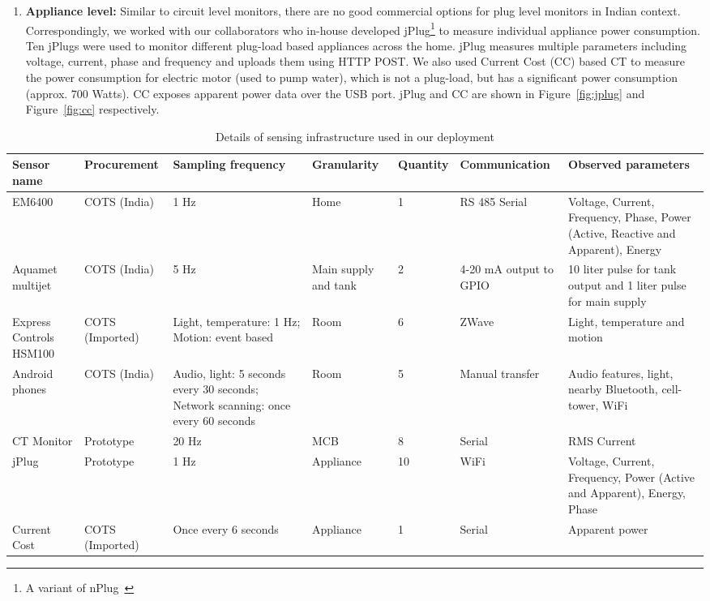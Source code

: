 \documentclass[10pt]{sensys-proc}
\newcommand{\figref}[1]{Figure~\ref{#1}}
\begin{document}
\begin{enumerate}[leftmargin=1em]
\vspace{-1.5mm} \item \textbf{Appliance level:} Similar to circuit level monitors, there are no good commercial options for plug level monitors in Indian context. Correspondingly, we worked with our collaborators who in-house developed jPlug\footnote{A variant of nPlug~\cite{nplug}} to measure individual appliance power consumption. Ten jPlugs were used to monitor different plug-load based appliances across the home. 
jPlug measures multiple parameters including voltage, current, phase and frequency and uploads them using HTTP POST. We also used Current Cost (CC) based CT to measure the power consumption for electric motor (used to pump water), which is not a plug-load, but has a significant power consumption (approx. 700 Watts). CC exposes apparent power data over the USB port.  jPlug and CC are shown in \figref{fig:jplug} and \figref{fig:cc} respectively.
\end{enumerate}
\begin{table}[t!]
\footnotesize
\centering
\vspace{-6mm}
\caption{Details of sensing infrastructure used in our deployment}
\vspace{-4mm}
\label{tab:sensing}
\tabcolsep=0.015cm
\begin{center}
\begin{tabular}{|p{1.7cm}|p{2.0cm}|p{3.3cm}|p{1.5cm}|p{1.5cm}|p{2.0cm}|p{5.2cm}|}
\hline
\textbf{Sensor name} & \textbf{Procurement} & \textbf{Sampling frequency} & \textbf{Granularity} & \textbf{Quantity} & \textbf{Communication} & \textbf{Observed parameters}\\
\hline

EM6400& COTS (India)&1 Hz&Home&1&RS 485 Serial&Voltage, Current, Frequency, Phase, Power (Active, Reactive and Apparent), Energy\\ \hline
Aquamet multijet & COTS (India) &5 Hz&Main supply and tank&2&4-20 mA output to GPIO &10 liter pulse for tank output and 1 liter pulse for main supply\\ \hline
Express Controls HSM100 &COTS (Imported)&Light, temperature: 1 Hz; Motion: event based &Room &6&ZWave&Light, temperature and motion\\ \hline
Android phones &COTS (India) & Audio, light: 5 seconds every 30 seconds; Network scanning: once every 60 seconds&Room&5&Manual transfer&Audio features, light, nearby Bluetooth, cell-tower, WiFi\\ \hline
CT Monitor&Prototype &20 Hz&MCB&8&Serial&RMS Current \\\hline
jPlug& Prototype &1 Hz &Appliance&10&WiFi&Voltage, Current, Frequency, Power (Active and Apparent), Energy, Phase\\ \hline	
Current Cost&COTS (Imported)& Once every 6 seconds &Appliance&1&Serial&Apparent power\\ \hline
\end{tabular}
\end{center}
\vspace{-4mm}
\end{table}
\end{document}
